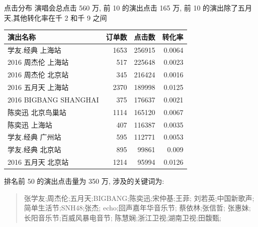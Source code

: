 \documentclass[presentation, bigger]{beamer}
\begin{document}
\begin{frame}[allowframebreaks,label=]{点击分布}
演唱会总点击 560 万, 前 10 的演出点击 165 万, 前 10 的演出除了五月天,其他转化率在千 2 和千 9 之间
\begin{center}
\begin{tabular}{lrrr}
演出名称 & 订单数 & 点击数 & 转化率\\
\hline
学友.经典 上海站 & 1653 & 256915 & 0.0064\\
2016 周杰伦 上海站 & 517 & 225648 & 0.0023\\
2016 周杰伦 北京站 & 345 & 216424 & 0.0016\\
2016 五月天 上海站 & 2370 & 189998 & 0.0125\\
2016 BIGBANG SHANGHAI & 375 & 176637 & 0.0021\\
陈奕迅 北京鸟巢站 & 1114 & 165120 & 0.0067\\
陈奕迅 上海站 & 407 & 116387 & 0.0035\\
学友.经典 广州站 & 595 & 112771 & 0.0053\\
学友.经典 北京站 & 895 & 99861 & 0.009\\
2016 五月天 北京站 & 1214 & 95994 & 0.0126\\
\end{tabular}
\end{center}

\framebreak
排名前 50 的演出点击量为 350 万, 涉及的关键词为:

\begin{quote}
张学友;周杰伦;五月天;BIGBANG;陈奕迅;宋仲基;王菲;
刘若英;中国新歌声;简单生活节;SNH48;张杰;
echo;回声嘉年华音乐节; 蔡依林;张信哲;
张惠妹;长阳音乐节;百威风暴电音节;
陈慧娴;浙江卫视;湖南卫视;田馥甄;
\end{quote}
\end{frame}
\end{document}
